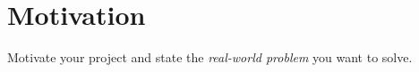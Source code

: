 \section{Motivation}

Motivate your project and state the \textit{real-world problem} you want to solve.